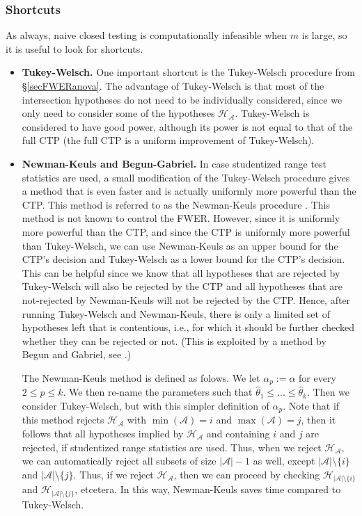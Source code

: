 \documentclass[11pt]{article}
\theoremstyle{plain}
\theoremstyle{definition}
\newcommand{\A}{\mathcal{A}}
\newcommand{\Hy}{\mathcal{H}}
\newcommand{\citp}{\citep}
\begin{document}
\subsubsection{Shortcuts}
As always, naive closed testing is computationally infeasible when $m$ is large, so it is useful to look for shortcuts. 
\begin{itemize}
\item
\textbf{Tukey-Welsch.} One important shortcut is the Tukey-Welsch procedure from \S\ref{secFWERanova}. The advantage of Tukey-Welsch is that most of the intersection hypotheses do not need to be individually considered, since we only need to consider some of the hypotheses $\Hy_{\A}$.
Tukey-Welsch is considered to have good power, although its power is not equal to that of the full CTP (the full CTP is a uniform improvement of Tukey-Welsch).

\item
\textbf{Newman-Keuls and Begun-Gabriel.}
In case studentized range test statistics are used, a small modification of the Tukey-Welsch procedure gives a method that is even faster and is actually uniformly more powerful than the CTP. This method is referred to as the Newman-Keuls procedure \citp[][p.66]{hochberg1987multiple}. This method is not known to control the FWER.
However, since it is uniformly more powerful than the CTP, and since the CTP is uniformly more powerful than Tukey-Welsch,  we can use Newman-Keuls as an upper bound for the CTP's decision and Tukey-Welsch as a lower bound for the CTP's decision.
 This can be helpful since we know that all hypotheses that are rejected by Tukey-Welsch will also be rejected by the CTP and all hypotheses that are not-rejected by Newman-Keuls will not be rejected by the CTP. Hence, after running Tukey-Welsch and Newman-Keuls, there is  only a limited set of hypotheses left that is contentious, i.e., for which it should be further checked whether they can be rejected or not. (This is exploited by a method by Begun and Gabriel, see  \citealp[][p.122]{hochberg1987multiple}.)

The Newman-Keuls method is defined as folows. We let $\alpha_p:=\alpha$ for every $2\leq p \leq k$.
We then re-name the  parameters such that $\hat{\theta}_{1}\leq ... \leq \hat{\theta}_{k}$.
Then we consider Tukey-Welsch, but with this simpler definition of $\alpha_p$. Note that if this method rejects
$\Hy_{\A}$ with $\min(\A)=i$ and $\max(\A)=j$, then it follows that all hypotheses implied by $\Hy_{\A}$ and containing $i$ and $j$ are rejected, if studentized range statistics are used.  Thus, when we reject $\Hy_{\A}$, we can automatically reject all subsets of size $|\A|-1$ as well, except $|\A|\setminus \{i\}$ and $|\A|\setminus \{j\}$. Thus, if we reject $\Hy_{\A}$, then we can proceed by checking  $\Hy_{|\A|\setminus \{i\}}$ and $\Hy_{|\A|\setminus \{j\}}$, etcetera. In this way, Newman-Keuls saves time compared to Tukey-Welsch.


\end{itemize}
\end{document}

